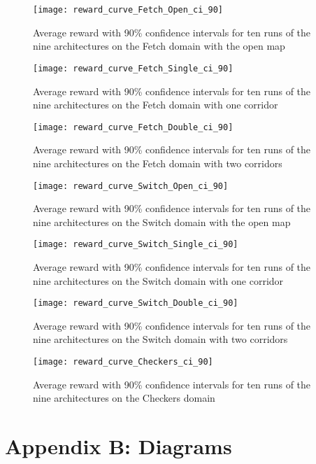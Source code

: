 \documentclass{article}
\begin{document}
\begin{SCfigure}
\begin{figure}[h!]
\centering
\texttt{[image: reward\_curve\_Fetch\_Open\_ci\_90]}
\caption{Average reward with 90\% confidence intervals for ten runs of the nine architectures on the Fetch domain with the open map}
\end{figure}
\begin{figure}[h!]
\centering
\texttt{[image: reward\_curve\_Fetch\_Single\_ci\_90]}
\caption{Average reward with 90\% confidence intervals for ten runs of the nine architectures on the Fetch domain with one corridor}
\end{figure}
\begin{figure}[h!]
\centering
\texttt{[image: reward\_curve\_Fetch\_Double\_ci\_90]}
\caption{Average reward with 90\% confidence intervals for ten runs of the nine architectures on the Fetch domain with two corridors}
\end{figure}
\begin{figure}[h!]
\centering
\texttt{[image: reward\_curve\_Switch\_Open\_ci\_90]}
\caption{Average reward with 90\% confidence intervals for ten runs of the nine architectures on the Switch domain with the open map}
\end{figure}
\begin{figure}[h!]
\centering
\texttt{[image: reward\_curve\_Switch\_Single\_ci\_90]}
\caption{Average reward with 90\% confidence intervals for ten runs of the nine architectures on the Switch domain with one corridor}
\end{figure}

\begin{figure}[h!]
\centering
\texttt{[image: reward\_curve\_Switch\_Double\_ci\_90]}
\caption{Average reward with 90\% confidence intervals for ten runs of the nine architectures on the Switch domain with two corridors}
\end{figure}

\begin{figure}[h!]
\centering
\texttt{[image: reward\_curve\_Checkers\_ci\_90]}
\caption{Average reward with 90\% confidence intervals for ten runs of the nine architectures on the Checkers domain}
\end{figure}







\FloatBarrier
\section*{Appendix B: Diagrams}


\end{SCfigure}
\end{document}
